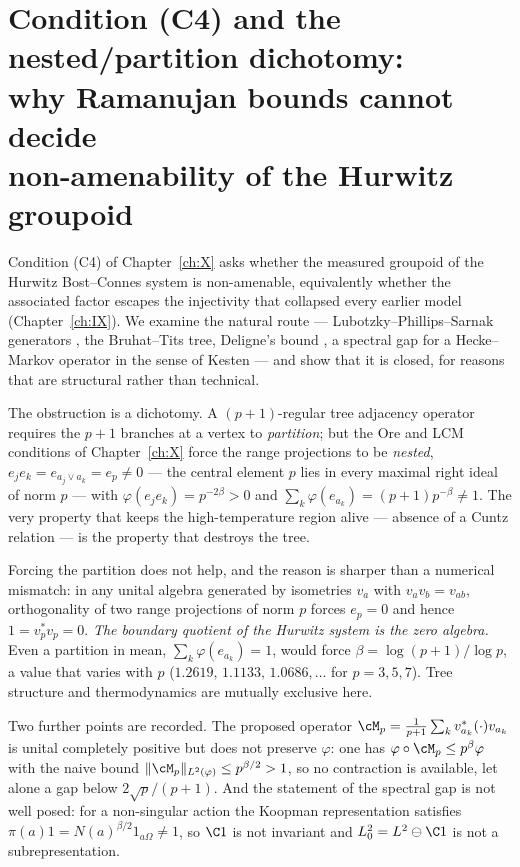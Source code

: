 \chapter[The Ramanujan route to (C4) is closed]{Condition \textup{(C4)} and the nested/partition dichotomy:\\ why Ramanujan bounds cannot decide\\ non-amenability of the Hurwitz groupoid}\label{ch:XI}
\begin{summary}
Condition (C4) of Chapter~\ref{ch:X} asks whether the measured groupoid of the Hurwitz
Bost--Connes system is non-amenable, equivalently whether the associated factor escapes the
injectivity that collapsed every earlier model (Chapter~\ref{ch:IX}). We examine the natural route ---
Lubotzky--Phillips--Sarnak generators \cite{LPS}, the Bruhat--Tits tree, Deligne's bound
\cite{Deligne}, a spectral gap for a Hecke--Markov operator in the sense of Kesten
\cite{Kesten} --- and show that it is closed, for reasons that are structural rather than
technical.

The obstruction is a dichotomy. A $(p+1)$-regular tree adjacency operator requires the $p+1$
branches at a vertex to \emph{partition}; but the Ore and LCM conditions of Chapter~\ref{ch:X} force
the range projections to be \emph{nested}, $e_je_k=e_{a_j\vee a_k}=e_p\ne0$ --- the central
element $p$ lies in every maximal right ideal of norm $p$ --- with $\varphi(e_je_k)=p^{-2\beta}>0$
and $\sum_k\varphi(e_{a_k})=(p+1)p^{-\beta}\ne1$. The very property that keeps the
high-temperature region alive --- absence of a Cuntz relation --- is the property that
destroys the tree.

Forcing the partition does not help, and the reason is sharper than a numerical mismatch: in
any unital algebra generated by isometries $v_a$ with $v_av_b=v_{ab}$, orthogonality of two
range projections of norm $p$ forces $e_p=0$ and hence $1=v_p^*v_p=0$. \emph{The boundary
quotient of the Hurwitz system is the zero algebra.} Even a partition in mean,
$\sum_k\varphi(e_{a_k})=1$, would force $\beta=\log(p+1)/\log p$, a value that varies with $p$
($1.2619,\,1.1133,\,1.0686,\dots$ for $p=3,5,7$). Tree structure and thermodynamics are
mutually exclusive here.

Two further points are recorded. The proposed operator
$\cM_p=\frac{1}{p+1}\sum_kv_{a_k}^*(\cdot)v_{a_k}$ is unital completely positive but does not
preserve $\varphi$: one has $\varphi\circ\cM_p\le p^{\beta}\varphi$ with the naive bound
$\|\cM_p\|_{L^2(\varphi)}\le p^{\beta/2}>1$, so no contraction is available, let alone a gap
below $2\sqrt p/(p+1)$. And the statement of the spectral gap is not well posed: for a
non-singular action the Koopman representation satisfies $\pi(a)1=N(a)^{\beta/2}1_{a\Omega}\ne1$,
so $\C1$ is not invariant and $L^2_0=L^2\ominus\C1$ is not a subrepresentation.


\end{summary}
